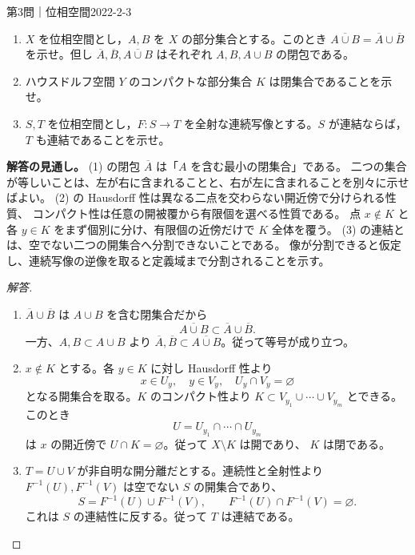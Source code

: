 \begin{problem}{第3問｜位相空間}{2022-2-3}
\begin{enumerate}
  \item[(1)] $X$ を位相空間とし，$A,B$ を $X$ の部分集合とする。このとき $\overline{A\cup B}=\overline A\cup\overline B$ を示せ。但し $\overline A,\overline B,\overline{A\cup B}$ はそれぞれ $A,B,A\cup B$ の閉包である。
  \item[(2)] ハウスドルフ空間 $Y$ のコンパクトな部分集合 $K$ は閉集合であることを示せ。
  \item[(3)] $S,T$ を位相空間とし，$F:S\to T$ を全射な連続写像とする。$S$ が連結ならば，$T$ も連結であることを示せ。
\end{enumerate}
\end{problem}
\begin{memo*}
\textbf{解答の見通し。}
(1) の閉包 $\overline A$ は「$A$ を含む最小の閉集合」である。
二つの集合が等しいことは、左が右に含まれることと、右が左に含まれることを別々に示せばよい。
(2) の Hausdorff 性は異なる二点を交わらない開近傍で分けられる性質、
コンパクト性は任意の開被覆から有限個を選べる性質である。
点 $x\notin K$ と各 $y\in K$ をまず個別に分け、有限個の近傍だけで $K$ 全体を覆う。
(3) の連結とは、空でない二つの開集合へ分割できないことである。
像が分割できると仮定し、連続写像の逆像を取ると定義域まで分割されることを示す。
\end{memo*}
\begin{proof}[解答]
\begin{enumerate}
  \item[(1)] $\overline A\cup\overline B$ は $A\cup B$ を含む閉集合だから
  \[
  \overline{A\cup B}\subset\overline A\cup\overline B.
  \]
  一方、$A,B\subset A\cup B$ より
  $\overline A,\overline B\subset\overline{A\cup B}$。従って等号が成り立つ。

  \item[(2)] $x\notin K$ とする。各 $y\in K$ に対し Hausdorff 性より
  \[
  x\in U_y,\quad y\in V_y,\quad U_y\cap V_y=\varnothing
  \]
  となる開集合を取る。$K$ のコンパクト性より
  $K\subset V_{y_1}\cup\cdots\cup V_{y_m}$ とできる。このとき
  \[
  U=U_{y_1}\cap\cdots\cap U_{y_m}
  \]
  は $x$ の開近傍で $U\cap K=\varnothing$。従って $X\setminus K$ は開であり、
  $K$ は閉である。

  \item[(3)] $T=U\cup V$ が非自明な開分離だとする。連続性と全射性より
  $F^{-1}(U),F^{-1}(V)$ は空でない $S$ の開集合であり、
  \[
  S=F^{-1}(U)\cup F^{-1}(V),\qquad
  F^{-1}(U)\cap F^{-1}(V)=\varnothing.
  \]
  これは $S$ の連結性に反する。従って $T$ は連結である。
\end{enumerate}
\end{proof}
